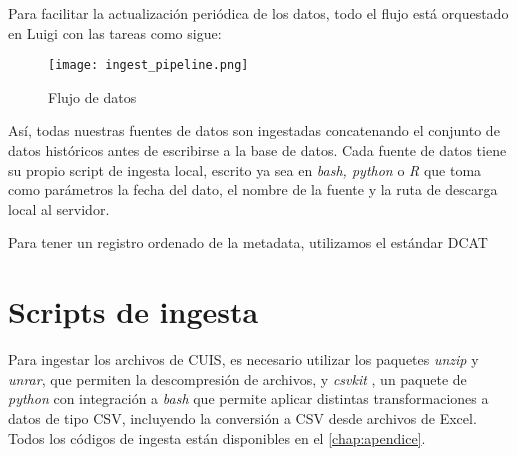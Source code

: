 \par
\noindent
Para facilitar la actualización periódica de los datos, todo el flujo está orquestado en Luigi con las tareas como sigue:
\par
\noindent
\begin{figure}[h]
    \caption{Flujo de datos}
    \centering
    \texttt{[image: ingest\_pipeline.png]}
\end{figure}
Así, todas nuestras fuentes de datos son ingestadas concatenando el conjunto de datos históricos antes de escribirse a la base de datos. Cada fuente de datos tiene su propio script de ingesta local, escrito ya sea en \textit{bash, python} o \textit{R} que toma como parámetros la fecha del dato, el nombre de la fuente y la ruta de descarga local al servidor.
\par
\noindent
Para tener un registro ordenado de la metadata, utilizamos el estándar DCAT
\section*{Scripts de ingesta}
Para ingestar los archivos de CUIS, es necesario utilizar los paquetes \textit{unzip} y \textit{unrar}\cite{unrar_debian, unzip_debian}, que permiten la descompresión de archivos, y \textit{csvkit} \cite{csvkit}, un paquete de \textit{python} con integración a \textit{bash} que permite aplicar distintas transformaciones a datos de tipo CSV, incluyendo la conversión a CSV desde archivos de Excel.
Todos los códigos de ingesta están disponibles en el \autoref{chap:apendice}.
